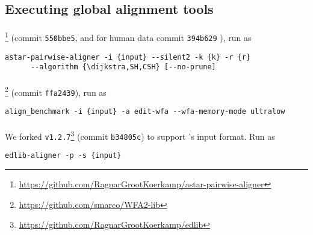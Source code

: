 \subsection{Executing global alignment tools}\label{GLOBALsec:app-tools}


\paragraph{\astarpa}\footnote{\url{https://github.com/RagnarGrootKoerkamp/astar-pairwise-aligner}}
(commit \texttt{550bbe5}, and for human data commit \texttt{394b629} ),
run as
\begin{Verbatim}[fontsize=\footnotesize]
  astar-pairwise-aligner -i {input} --silent2 -k {k} -r {r}
      --algorithm {\dijkstra,SH,CSH} [--no-prune]
\end{Verbatim}

\paragraph{\wfa}\footnote{\url{https://github.com/smarco/WFA2-lib}}
(commit \texttt{ffa2439}),
run as
\begin{Verbatim}[fontsize=\footnotesize]
  align_benchmark -i {input} -a edit-wfa --wfa-memory-mode ultralow
\end{Verbatim}

\paragraph{\edlib} We forked \texttt{v1.2.7}\footnote{\url{https://github.com/RagnarGrootKoerkamp/edlib}}
(commit \texttt{b34805c})
to support \oldwfa's input format. Run as
\begin{Verbatim}[fontsize=\footnotesize]
  edlib-aligner -p -s {input}
\end{Verbatim}

